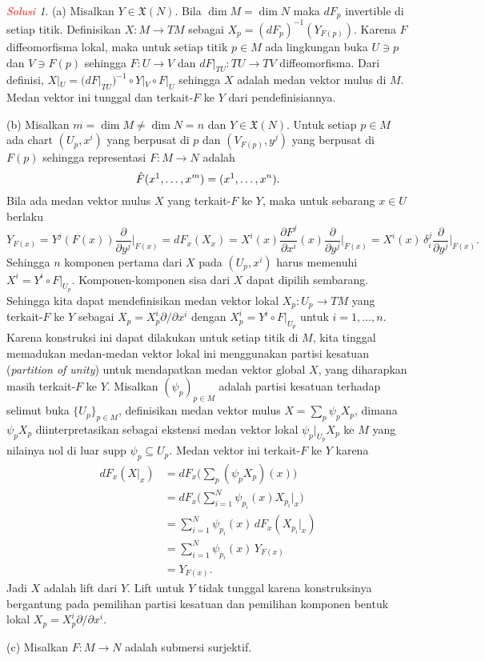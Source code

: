\documentclass[11pt]{article}
\theoremstyle{definition}
\theoremstyle{remark}
\newtheorem*{solution}{\textcolor{red}{Solusi}}
\newcommand{\doo}{\partial}
\newcommand{\ddyj}{\frac{\partial}{\partial y^j}}
\newcommand{\vectfield}{\mathfrak{X}}       %
\begin{document}
\begin{solution}
(a) Misalkan $Y \in \vectfield(N)$. Bila $\dim M = \dim N$ maka $dF_p$ invertible di setiap titik. Definisikan $X : M \to TM$ sebagai $X_p = (dF_p)^{-1}(Y_{F(p)})$. Karena $F$ diffeomorfisma lokal, maka untuk setiap titik $p \in M$ ada lingkungan buka $U\ni p$ dan $V\ni F(p)$ sehingga $F: U \to V$ dan $dF|_{TU} : TU \to TV$ diffeomorfisma. Dari definisi, $X|_U = (dF|_{TU})^{-1} \circ Y|_V \circ F|_U$ sehingga $X$ adalah medan vektor mulus di $M$. Medan vektor ini tunggal dan terkait-$F$ ke $Y$ dari pendefinisiannya. 

(b) Misalkan $m=\dim M \neq \dim N=n$ dan $Y \in \vectfield(N)$. Untuk setiap $p \in M$ ada chart $(U_p,x^i)$ yang berpusat di $p$ dan $(V_{F(p)},y^j)$ yang berpusat di $F(p)$ sehingga representasi $F: M \to N$ adalah
$$
\Hat{F}(x^1,\dots,x^m) = (x^1,\dots,x^n).
$$
Bila ada medan vektor mulus $X$ yang terkait-$F$ ke $Y$, maka untuk sebarang $x \in U$ berlaku
$$
Y_{F(x)} = Y^j(F(x)) \ddyj\Big|_{F(x)} =  dF_x(X_x) = X^i(x) \frac{\doo F^j}{\doo x^i}(x) \ddyj\Big|_{F(x)} = X^i(x) \, \delta^j_i \ddyj\Big|_{F(x)}.
$$
Sehingga $n$ komponen pertama dari $X$ pada $(U_p,x^i)$ harus memenuhi $X^i = Y^i \circ F|_{U_p}$. Komponen-komponen sisa dari $X$ dapat dipilih sembarang. Sehingga kita dapat mendefinisikan  medan vektor lokal $X_p : U_p \to TM$ yang terkait-$F$ ke $Y$ sebagai $X_p = X_p^i \partial/\partial x^i$ dengan $X_p^i = Y^i \circ F|_{U_p}$ untuk $i=1,\dots,n$. Karena konstruksi ini dapat dilakukan untuk setiap titik di $M$, kita tinggal memadukan medan-medan vektor lokal ini menggunakan partisi kesatuan (\textit{partition of unity}) untuk mendapatkan medan vektor global $X$, yang diharapkan masih terkait-$F$ ke $Y$. Misalkan $(\psi_p)_{p \in M}$ adalah partisi kesatuan terhadap selimut buka $\{U_p\}_{p \in M}$, definisikan medan vektor mulus $X =\sum_p \psi_p X_p$, dimana $\psi_p X_p$ diinterpretasikan sebagai ekstensi medan vektor lokal $\psi_p|_{U_p} X_p$ ke $M$ yang nilainya nol di luar $\text{supp }\psi_p \subseteq U_p$. Medan vektor ini terkait-$F$ ke $Y$ karena
\begin{align*}
dF_x(X|_x) &= dF_x \Big( \sum_{p} (\psi_p X_p)(x) \Big) \\
&= dF_x\Big(  \sum_{i=1}^N \psi_{p_i}(x) X_{p_i}|_x \Big) \\
&= \sum_{i=1}^N \psi_{p_i}(x)\, dF_x(X_{p_i}|_x) \\
&= \sum_{i=1}^N \psi_{p_i}(x)\, Y_{F(x)} \\
&= Y_{F(x)}.
\end{align*}
Jadi $X$ adalah lift dari $Y$. Lift untuk $Y$ tidak tunggal karena konstruksinya bergantung pada pemilihan partisi kesatuan dan pemilihan komponen bentuk lokal $X_p = X^i_p \partial/\partial x^i$.

(c) Misalkan $F : M \to N$ adalah submersi surjektif.
\end{solution}
\end{document}
